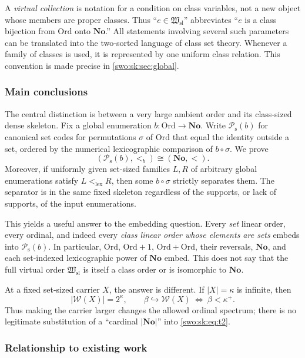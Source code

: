 \documentclass[11pt]{article}
\theoremstyle{definition}
\theoremstyle{remark}
\newcommand{\No}{\mathbf{No}}
\newcommand{\Ord}{\mathrm{Ord}}
\newcommand{\W}{\mathcal W}
\newcommand{\Hsl}{\mathfrak W_{\mathrm{sl}}}
\newcommand{\Psupp}{\mathcal P_{\mathrm{s}}}
\newcommand{\lex}{\mathrm{lex}}
\newcommand{\emb}{\hookrightarrow}
\begin{document}
A \emph{virtual collection} is notation for a condition on class
variables, not a new object whose members are proper classes. Thus
``$e\in\Hsl$'' abbreviates ``$e$ is a class bijection from $\Ord$ onto
$\No$.'' All statements involving several such parameters can be
translated into the two-sorted language of class set theory. Whenever a
family of classes is used, it is represented by one uniform class
relation. This convention is made precise in \cref{swo:sk:sec:global}.

\subsubsection{Main conclusions}

The central distinction is between a very large ambient order and its
class-sized dense skeleton. Fix a global enumeration $b:\Ord\to\No$.
Write $\Psupp(b)$ for canonical set codes for permutations $\sigma$ of
$\Ord$ that equal the identity outside a set, ordered by the numerical
lexicographic comparison of $b\circ\sigma$. We prove
\[
                 (\Psupp(b),<_{b})\cong(\No,<).                 \tag{S08.1}\label{swo:sk:eq:t1}
\]
Moreover, if uniformly given set-sized families $L,R$ of arbitrary global
enumerations satisfy $L<_{\lex}R$, then some $b\circ\sigma$ strictly
separates them. The separator is in the same fixed skeleton regardless
of the supports, or lack of supports, of the input enumerations.

This yields a useful answer to the embedding question. Every
\emph{set} linear order, every ordinal, and indeed every
\emph{class linear order whose elements are sets} embeds into
$\Psupp(b)$. In particular, $\Ord$, $\Ord+1$, $\Ord+\Ord$, their reversals,
$\No$, and each set-indexed lexicographic power of $\No$ embed. This does
not say that the full virtual order $\Hsl$ is itself a class order or is
isomorphic to $\No$.

At a fixed set-sized carrier $X$, the answer is different. If
$|X|=\kappa$ is infinite, then
\[
 |\W(X)|=2^\kappa,
 \qquad
 \beta\emb\W(X)\ \Longleftrightarrow\ \beta<\kappa^+.
                                                               \tag{S08.2}\label{swo:sk:eq:t2}
\]
Thus making the carrier larger changes the allowed ordinal spectrum;
there is no legitimate substitution of a ``cardinal $|\No|$'' into \eqref{swo:sk:eq:t2}.

\subsubsection{Relationship to existing work}
\end{document}
